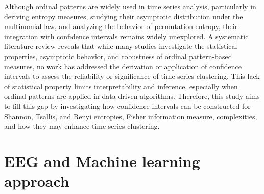 Although ordinal patterns are widely used in time series analysis, particularly in deriving entropy measures, studying their asymptotic distribution under the multinomial law, and analyzing the behavior of permutation entropy, their integration with confidence intervals remains widely unexplored. A systematic literature review reveals that while many studies investigate the statistical properties, asymptotic behavior, and robustness of ordinal pattern-based measures, no work has addressed the derivation or application of confidence intervals to assess the reliability or significance of time series clustering. This lack of statistical property limits interpretability and inference, especially when ordinal patterns are applied in data-driven algorithms. Therefore, this study aims to fill this gap by investigating how confidence intervals can be constructed for Shannon, Tsallis, and Renyi entropies, Fisher information measure, complexities, and how they may enhance time series clustering.

\section{EEG and Machine learning approach}\label{Sec:ReviewTopicEEG}


